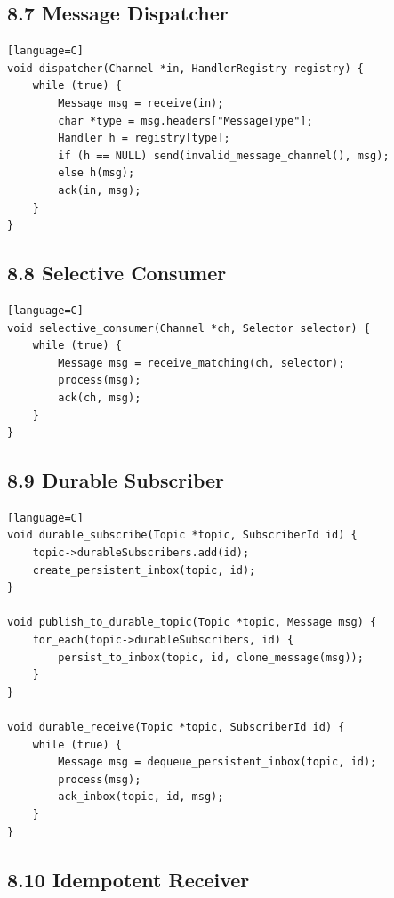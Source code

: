 \documentclass[11pt]{article}
\begin{document}
\subsection{8.7 Message Dispatcher}\label{message-dispatcher}

\begin{verbatim}[language=C]
void dispatcher(Channel *in, HandlerRegistry registry) {
    while (true) {
        Message msg = receive(in);
        char *type = msg.headers["MessageType"];
        Handler h = registry[type];
        if (h == NULL) send(invalid_message_channel(), msg);
        else h(msg);
        ack(in, msg);
    }
}
\end{verbatim}

\subsection{8.8 Selective Consumer}\label{selective-consumer}

\begin{verbatim}[language=C]
void selective_consumer(Channel *ch, Selector selector) {
    while (true) {
        Message msg = receive_matching(ch, selector);
        process(msg);
        ack(ch, msg);
    }
}
\end{verbatim}

\subsection{8.9 Durable Subscriber}\label{durable-subscriber}

\begin{verbatim}[language=C]
void durable_subscribe(Topic *topic, SubscriberId id) {
    topic->durableSubscribers.add(id);
    create_persistent_inbox(topic, id);
}

void publish_to_durable_topic(Topic *topic, Message msg) {
    for_each(topic->durableSubscribers, id) {
        persist_to_inbox(topic, id, clone_message(msg));
    }
}

void durable_receive(Topic *topic, SubscriberId id) {
    while (true) {
        Message msg = dequeue_persistent_inbox(topic, id);
        process(msg);
        ack_inbox(topic, id, msg);
    }
}
\end{verbatim}

\subsection{8.10 Idempotent Receiver}\label{idempotent-receiver}
\end{document}
